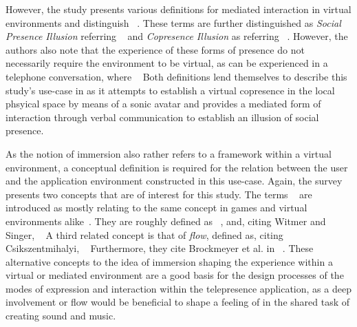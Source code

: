 However, the study presents various definitions for mediated interaction in virtual environments and distinguish ~\parencite[4]{surveyOfPresence}.
These terms are further distinguished as \emph{Social Presence Illusion} referring ~\parencite[4]{surveyOfPresence} and \emph{Copresence Illusion} as referring ~\parencite[5]{surveyOfPresence}. However, the authors also note that the experience of these forms of presence do not necessarily require the environment to be virtual, as can be experienced in a telephone conversation, where ~\parencite[5]{surveyOfPresence}
Both definitions lend themselves to describe this study's use-case in as it attempts to establish a virtual copresence in the local phsyical space by means of a sonic avatar and provides a mediated form of interaction through verbal communication to establish an illusion of social presence.

As the notion of immersion also rather refers to a framework within a virtual environment, a conceptual definition is required for the relation between the user and the application environment constructed in this use-case.
Again, the survey presents two concepts that are of interest for this study.
The terms ~\parencite[8]{surveyOfPresence} are introduced as mostly relating to the same concept in games and virtual environments alike~\parencite[8]{surveyOfPresence}.
They are roughly defined as ~\parencite[8]{surveyOfPresence}, and, citing Witmer and Singer, ~\parencite[8]{surveyOfPresence}
A third related concept is that of \emph{flow}, defined as, citing Csikszentmihalyi, ~\parencite[9]{surveyOfPresence}
Furthermore, they cite Brockmeyer et al. in ~\parencite[9]{surveyOfPresence}.
These alternative concepts to the idea of immersion shaping the experience within a virtual or mediated environment are a good basis for the design processes of the modes of expression and interaction within the telepresence application, as a deep involvement or flow would be beneficial to shape a feeling of  in the shared task of creating sound and music.

